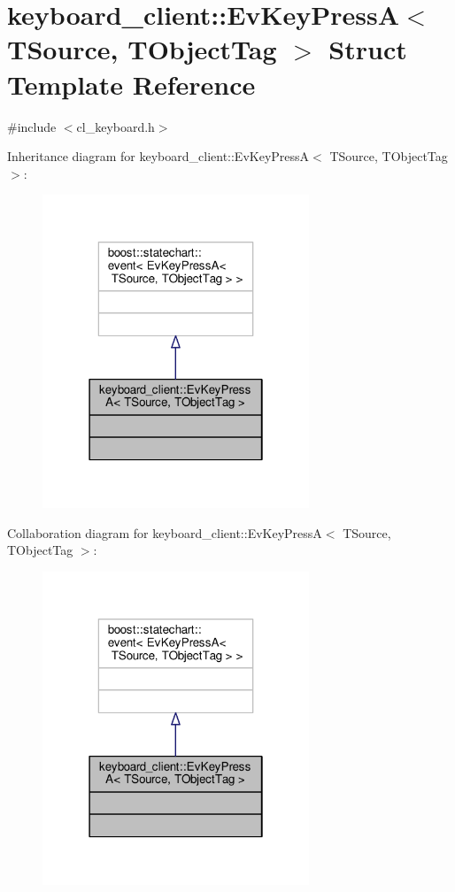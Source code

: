 \hypertarget{structkeyboard__client_1_1EvKeyPressA}{}\section{keyboard\+\_\+client\+:\+:Ev\+Key\+PressA$<$ T\+Source, T\+Object\+Tag $>$ Struct Template Reference}
\label{structkeyboard__client_1_1EvKeyPressA}


{\ttfamily \#include $<$cl\+\_\+keyboard.\+h$>$}



Inheritance diagram for keyboard\+\_\+client\+:\+:Ev\+Key\+PressA$<$ T\+Source, T\+Object\+Tag $>$\+:\nopagebreak
\begin{figure}[H]
\begin{center}
\leavevmode
\includegraphics[width=226pt]{structkeyboard__client_1_1EvKeyPressA__inherit__graph}
\end{center}
\end{figure}


Collaboration diagram for keyboard\+\_\+client\+:\+:Ev\+Key\+PressA$<$ T\+Source, T\+Object\+Tag $>$\+:\nopagebreak
\begin{figure}[H]
\begin{center}
\leavevmode
\includegraphics[width=226pt]{structkeyboard__client_1_1EvKeyPressA__coll__graph}
\end{center}
\end{figure}


